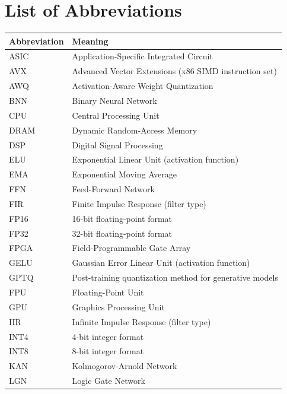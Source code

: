 \clearpage
\section*{List of Abbreviations}
\label{sec:abbreviations}

\begin{tabular}{@{}ll@{}}
  \toprule
  \textbf{Abbreviation} & \textbf{Meaning} \\
  \midrule
  ASIC   & Application-Specific Integrated Circuit \\
  AVX    & Advanced Vector Extensions (x86 SIMD instruction set) \\
  AWQ    & Activation-Aware Weight Quantization \\
  BNN    & Binary Neural Network \\
  CPU    & Central Processing Unit \\
  DRAM   & Dynamic Random-Access Memory \\
  DSP    & Digital Signal Processing \\
  ELU    & Exponential Linear Unit (activation function) \\
  EMA    & Exponential Moving Average \\
  FFN    & Feed-Forward Network \\
  FIR    & Finite Impulse Response (filter type) \\
  FP16   & 16-bit floating-point format \\
  FP32   & 32-bit floating-point format \\
  FPGA   & Field-Programmable Gate Array \\
  GELU   & Gaussian Error Linear Unit (activation function) \\
  GPTQ   & Post-training quantization method for generative models \\
  FPU    & Floating-Point Unit \\
  GPU    & Graphics Processing Unit \\
  IIR    & Infinite Impulse Response (filter type) \\
  INT4   & 4-bit integer format \\
  INT8   & 8-bit integer format \\
  KAN    & Kolmogorov-Arnold Network \\
  LGN    & Logic Gate Network \\

\end{tabular}
